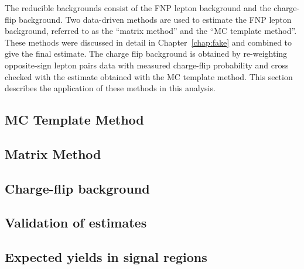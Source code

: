 The reducible backgrounds consist of the FNP lepton background and 
the charge-flip background.
Two data-driven methods are used to estimate the FNP lepton background, 
referred to as the ``matrix method'' and the ``MC template method''.
These methods were discussed in detail in Chapter~\ref{chap:fake}
and combined to give the final estimate. 
The charge flip background is obtained by re-weighting opposite-sign 
lepton pairs data with measured charge-flip probability and cross checked 
with the estimate obtained with the MC template method.
This section describes the application of these methods in this 
analysis.

\subsection{MC Template Method}\label{sec:bkg.red.mct}


\subsection{Matrix Method}\label{sec:bkg.red.mxm}


\subsection{Charge-flip background}\label{sec:bkg.red.chflip}


\subsection{Validation of estimates}\label{sec:bkg.red.val}


\subsection{Expected yields in signal regions}\label{sec:bkg.red.res}


